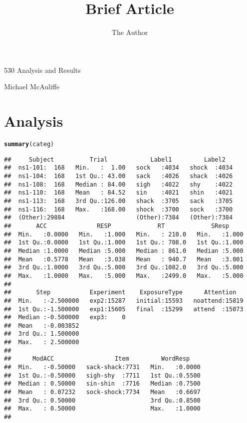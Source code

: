 \documentclass[11pt]{article}\usepackage[]{graphicx}\usepackage[]{color}
\title{Brief Article}
\author{The Author}
\makeatletter
\newcommand{\hlstd}[1]{\textcolor[rgb]{0.345,0.345,0.345}{#1}}%
\newcommand{\hlkwd}[1]{\textcolor[rgb]{0.737,0.353,0.396}{\textbf{#1}}}%
\newenvironment{kframe}{%
 \def\at@end@of@kframe{}%
 \ifinner\ifhmode%
  \def\at@end@of@kframe{\end{minipage}}%
  \begin{minipage}{\columnwidth}%
 \fi\fi%
 \def\FrameCommand##1{\hskip\@totalleftmargin \hskip-\fboxsep
 \colorbox{shadecolor}{##1}\hskip-\fboxsep
     \hskip-\linewidth \hskip-\@totalleftmargin \hskip\columnwidth}%
 \MakeFramed {\advance\hsize-\width
   \@totalleftmargin\z@ \linewidth\hsize
   \@setminipage}}%
 {\par\unskip\endMakeFramed%
 \at@end@of@kframe}
\newenvironment{knitrout}{}{} %
\makeatother
\begin{document}
\begin{center}
530 Analysis and Results

Michael McAuliffe
\end{center}

\section{Analysis}

\begin{knitrout}
\color{fgcolor}\begin{kframe}
\begin{alltt}
 \hlkwd{summary}\hlstd{(categ)}
\end{alltt}
\begin{verbatim}
##     Subject          Trial            Label1         Label2    
##  ns1-101:  168   Min.   :  1.00   sock   :4034   shock  :4034  
##  ns1-104:  168   1st Qu.: 43.00   sack   :4026   shack  :4026  
##  ns1-108:  168   Median : 84.00   sigh   :4022   shy    :4022  
##  ns1-110:  168   Mean   : 84.52   sin    :4021   shin   :4021  
##  ns1-113:  168   3rd Qu.:126.00   shack  :3705   sack   :3705  
##  ns1-116:  168   Max.   :168.00   shock  :3700   sock   :3700  
##  (Other):29884                    (Other):7384   (Other):7384  
##       ACC              RESP             RT             SResp      
##  Min.   :0.0000   Min.   :1.000   Min.   : 210.0   Min.   :1.000  
##  1st Qu.:0.0000   1st Qu.:1.000   1st Qu.: 708.0   1st Qu.:1.000  
##  Median :1.0000   Median :5.000   Median : 861.0   Median :5.000  
##  Mean   :0.5778   Mean   :3.038   Mean   : 940.7   Mean   :3.001  
##  3rd Qu.:1.0000   3rd Qu.:5.000   3rd Qu.:1082.0   3rd Qu.:5.000  
##  Max.   :1.0000   Max.   :5.000   Max.   :2499.0   Max.   :5.000  
##                                                                   
##       Step           Experiment    ExposureType      Attention    
##  Min.   :-2.500000   exp2:15287   initial:15593   noattend:15819  
##  1st Qu.:-1.500000   exp1:15605   final  :15299   attend  :15073  
##  Median :-0.500000   exp3:    0                                   
##  Mean   :-0.003852                                                
##  3rd Qu.: 1.500000                                                
##  Max.   : 2.500000                                                
##                                                                   
##      ModACC                 Item         WordResp     
##  Min.   :-0.50000   sack-shack:7731   Min.   :0.0000  
##  1st Qu.:-0.50000   sigh-shy  :7711   1st Qu.:0.5500  
##  Median : 0.50000   sin-shin  :7716   Median :0.7500  
##  Mean   : 0.07232   sock-shock:7734   Mean   :0.6697  
##  3rd Qu.: 0.50000                     3rd Qu.:0.8500  
##  Max.   : 0.50000                     Max.   :1.0000  
## 
\end{verbatim}
\end{kframe}
\end{knitrout}



\end{document}
